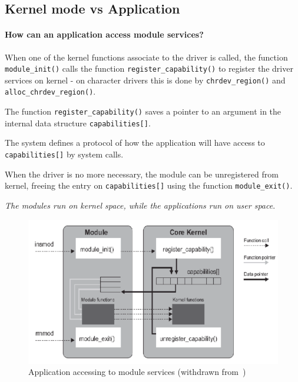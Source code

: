 \subsection{Kernel mode vs Application}

\paragraph{\textbf{How can an application access module services?}}

\begin{enum-c}[label=\roman*.]
%
\item When one of the kernel functions associate to the driver is called, the function \texttt{module\_init()} calls the function \texttt{register\_capability()} to register the driver services on kernel - on character drivers this is done by \texttt{chrdev\_region()} and \texttt{alloc\_chrdev\_region()}.
\item The function \texttt{register\_capability()} saves a pointer to an
  argument in the internal data structure \texttt{capabilities[]}.
\item The system defines a protocol of how the application
will have access to \texttt{capabilities[]} by system calls.
\item When the driver is no more necessary, the module
can be unregistered from kernel, freeing the entry on
\texttt{capabilities[]} using the function \texttt{module\_exit()}.
%
\end{enum-c}

\emph{The modules run on kernel space, while the applications run on user space}.
%
\begin{figure}[htb!]
\centering
    \includegraphics[width=0.8\columnwidth]{./img/ddrivers-kernel.png}
  \caption{Application accessing to module services (withdrawn from~\cite{ddrivers-slides})}%
\label{fig:ddrivers-kernel}
\end{figure}

